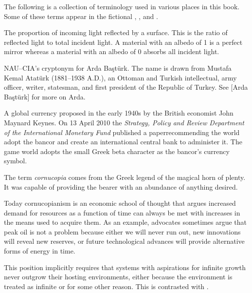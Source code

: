

The following is a collection of terminology used in various places in this book. Some of these terms appear in the fictional , \about[Timeline], and .

The proportion of incoming light reflected by a surface. This is the ratio of reflected light to total incident light. A material with an albedo of 1 is a perfect mirror whereas a material with an albedo of 0 absorbs all incident light.

NAU--CIA's cryptonym for Arda Baştürk. The name is drawn from Mustafa Kemal Atatürk (1881--1938 A.D.), an Ottoman and Turkish intellectual, army officer, writer, statesman, and first president of the Republic of Turkey. See [Arda Baştürk] for more on Arda.

A global currency proposed in the early 1940s by the British economist John Maynard Keynes. On 13 April 2010 the {\it Strategy, Policy and Review Department of the International Monetary Fund} published a paper recommending the world adopt the bancor and create an international central bank to administer it. The game world adopts the small Greek beta character
\begingroup
{}
\endgroup
as the bancor's currency symbol.

The term {\it cornucopia} comes from the Greek legend of the magical horn of plenty. It was capable of providing the bearer with an abundance of anything desired.

Today cornucopianism is an economic school of thought that argues increased demand for resources as a function of time can always be met with increases in the means used to acquire them. As an example, advocates sometimes argue that peak oil is not a problem because either we will never run out, new innovations will reveal new reserves, or future technological advances will provide alternative forms of energy in time.

This position implicitly requires that systems with aspirations for infinite growth never outgrow their hosting environments, either because the environment is treated as infinite or for some other reason. This is contrasted with \about[Malthusianism].

